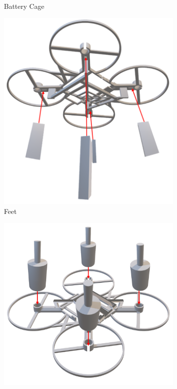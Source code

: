 \begin{manualblock}
\begin{figure}[H]
\begin{subfigure}[b]{0.44\linewidth}
    \caption{Battery Cage}
  \end{subfigure}
  \hfill
  \begin{subfigure}[b]{0.4\linewidth}
    \centering
    \includegraphics[width=\linewidth]{img/assembly-7.png}
    \caption{Feet}
  \end{subfigure}
  \begin{subfigure}[b]{0.44\linewidth}
    \centering
    \includegraphics[width=\linewidth]{img/manual/assemb2.png}

\end{subfigure}
\end{figure}
\end{manualblock}
